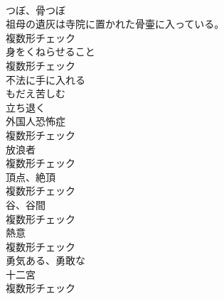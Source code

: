\documentclass[8pt]{extreport}
\begin{document}
\begin{CJK}{UTF8}{min}
\\	[名詞]	つぼ、骨つぼ	
\\	祖母の遺灰は寺院に置かれた骨壷に入っている。	
\\	複数形チェック
\\	[名詞]	身をくねらせること	
\\	複数形チェック
\\	[動詞]	不法に手に入れる	
\\	[動詞]	もだえ苦しむ	
\\	[動詞]	立ち退く	
\\	[名詞]	外国人恐怖症	
\\	複数形チェック
\\	[名詞]	放浪者	
\\	複数形チェック
\\	[名詞]	頂点、絶頂	
\\	複数形チェック
\\	[名詞]	谷、谷間	
\\	複数形チェック
\\	[名詞]	熱意	
\\	複数形チェック
\\	[形容詞]	勇気ある、勇敢な	
\\	[名詞]	十二宮	
\\	複数形チェック
\end{CJK}
\end{document}
